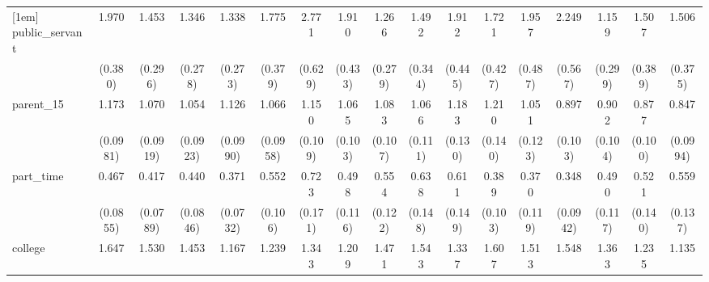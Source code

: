{\begin{tabular}{l*{16}{c}}
[1em]
public\_servant      &       1.970\sym{***}&       1.453         &       1.346         &       1.338         &       1.775\sym{**} &       2.771\sym{***}&       1.910\sym{**} &       1.266         &       1.492         &       1.912\sym{**} &       1.721\sym{*}  &       1.957\sym{**} &       2.249\sym{**} &       1.159         &       1.507         &       1.506         \\
                    &     (0.380)         &     (0.296)         &     (0.278)         &     (0.273)         &     (0.379)         &     (0.629)         &     (0.433)         &     (0.279)         &     (0.344)         &     (0.445)         &     (0.427)         &     (0.487)         &     (0.567)         &     (0.299)         &     (0.389)         &     (0.375)         \\
[1em]
parent\_15           &       1.173         &       1.070         &       1.054         &       1.126         &       1.066         &       1.150         &       1.065         &       1.083         &       1.066         &       1.183         &       1.210         &       1.051         &       0.897         &       0.902         &       0.877         &       0.847         \\
                    &    (0.0981)         &    (0.0919)         &    (0.0923)         &    (0.0990)         &    (0.0958)         &     (0.109)         &     (0.103)         &     (0.107)         &     (0.111)         &     (0.130)         &     (0.140)         &     (0.123)         &     (0.103)         &     (0.104)         &     (0.100)         &    (0.0994)         \\
[1em]
part\_time           &       0.467\sym{***}&       0.417\sym{***}&       0.440\sym{***}&       0.371\sym{***}&       0.552\sym{**} &       0.723         &       0.498\sym{**} &       0.554\sym{**} &       0.638         &       0.611\sym{*}  &       0.389\sym{***}&       0.370\sym{**} &       0.348\sym{***}&       0.490\sym{**} &       0.521\sym{*}  &       0.559\sym{*}  \\
                    &    (0.0855)         &    (0.0789)         &    (0.0846)         &    (0.0732)         &     (0.106)         &     (0.171)         &     (0.116)         &     (0.122)         &     (0.148)         &     (0.149)         &     (0.103)         &     (0.119)         &    (0.0942)         &     (0.117)         &     (0.140)         &     (0.137)         \\
[1em]
college             &       1.647\sym{***}&       1.530\sym{***}&       1.453\sym{***}&       1.167         &       1.239         &       1.343\sym{*}  &       1.209         &       1.471\sym{**} &       1.543\sym{**} &       1.337\sym{*}  &       1.607\sym{**} &       1.513\sym{**} &       1.548\sym{**} &       1.363\sym{*}  &       1.235         &       1.135         \\

\end{tabular}}
